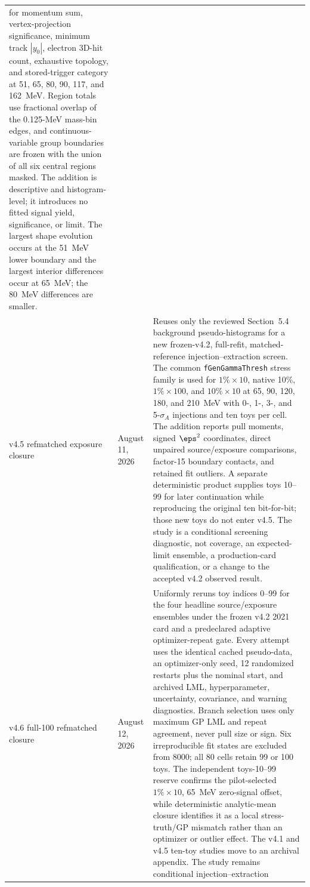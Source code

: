 \begin{longtable}{P{0.11\textwidth}P{0.16\textwidth}P{0.64\textwidth}}
for momentum sum, vertex-projection significance, minimum track $|y_0|$,
electron 3D-hit count, exhaustive topology, and stored-trigger category at
51, 65, 80, 90, 117, and 162~MeV.  Region totals use fractional overlap of
the 0.125-MeV mass-bin edges, and continuous-variable group boundaries are
frozen with the union of all six central regions masked.  The addition is
descriptive and histogram-level; it introduces no fitted signal yield,
significance, or limit.  The largest shape evolution occurs at the 51~MeV
lower boundary and the largest interior differences occur at 65~MeV; the
80~MeV differences are smaller. \\
\addlinespace
v4.5 refmatched exposure closure & August 11, 2026 &
Reuses only the reviewed Section~5.4 background pseudo-histograms for a new
frozen-v4.2, full-refit, matched-reference injection--extraction screen.  The
common \texttt{fGenGammaThresh} stress family is used for $1\%\times10$,
native 10\%, $1\%\times100$, and $10\%\times10$ at 65, 90, 120, 180, and
210~MeV with 0-, 1-, 3-, and 5-$\sigma_A$ injections and ten toys per cell.
The addition reports pull moments, signed $\eps^2$ coordinates, direct unpaired
source/exposure comparisons, factor-15 boundary contacts, and retained fit
outliers.  A separate deterministic product supplies toys 10--99 for later
continuation while reproducing the original ten bit-for-bit; those new toys do
not enter v4.5.  The study is a conditional screening diagnostic, not coverage,
an expected-limit ensemble, a production-card qualification, or a change to the
accepted v4.2 observed result. \\
\addlinespace
v4.6 full-100 refmatched closure & August 12, 2026 &
Uniformly reruns toy indices 0--99 for the four headline source/exposure
ensembles under the frozen v4.2 2021 card and a predeclared adaptive
optimizer-repeat gate.  Every attempt uses the identical cached pseudo-data,
an optimizer-only seed, 12 randomized restarts plus the nominal start, and
archived LML, hyperparameter, uncertainty, covariance, and warning diagnostics.
Branch selection uses only maximum GP LML and repeat agreement, never pull size
or sign.  Six irreproducible fit states are excluded from 8000; all 80 cells
retain 99 or 100 toys.  The independent toys-10--99 reserve confirms the
pilot-selected $1\%\times10$, 65~MeV zero-signal offset, while deterministic
analytic-mean closure identifies it as a local stress-truth/GP mismatch rather
than an optimizer or outlier effect.  The v4.1 and v4.5 ten-toy studies move to
an archival appendix.  The study remains conditional injection--extraction

\end{longtable}
